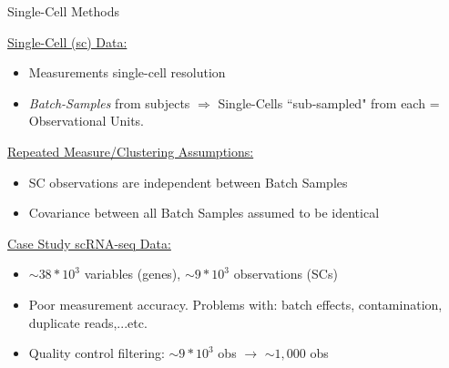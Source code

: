 \documentclass[11pt]{beamer}
\begin{document}
\begin{frame}{Single-Cell Methods}

\underline{Single-Cell (sc) Data:}
\begin{itemize}
	\item Measurements single-cell resolution
	\item \textit{Batch-Samples} from subjects $\Rightarrow$ Single-Cells ``sub-sampled" from each = Observational Units.
\end{itemize}

\vspace{5pt}

\underline{Repeated Measure/Clustering Assumptions:}
	\begin{itemize}
		\item SC observations are independent between Batch Samples
		\item Covariance between all Batch Samples assumed to be identical
	\end{itemize}

\vspace{5pt}

\underline{Case Study scRNA-seq Data:}
\begin{itemize}
	\item $\sim 38 * 10^{3}$ variables (genes), $\sim 9 * 10^3$ observations (SCs) 
	\item Poor measurement accuracy.  Problems with: batch effects, contamination, duplicate reads,...etc.
	\item Quality control filtering: $\sim 9 * 10^3$ obs $\longrightarrow$  $\sim 1,000$ obs \cite{SatijaLa52:online}
\end{itemize}
\end{frame}


%
%
\end{document}
